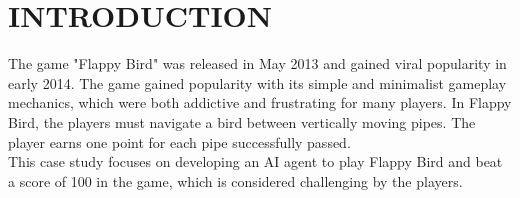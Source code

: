 \documentclass{lutmscthesis}[2017/10/03]
\begin{document}











\section{INTRODUCTION}
The game "Flappy Bird" was released in May 2013 and gained viral popularity in early 2014. The game gained popularity with its simple and minimalist gameplay mechanics, which were both addictive and frustrating for many players. In Flappy Bird, the players must navigate a bird between vertically moving pipes. The player earns one point for each pipe successfully passed.\\

This case study focuses on developing an AI agent to play Flappy Bird and beat a score of 100 in the game, which is considered challenging by the players. \cite{flappy_score} 



\end{document}
